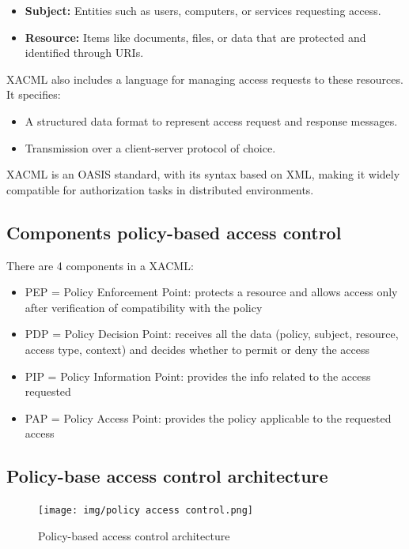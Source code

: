 \begin{itemize}
    \item \textbf{Subject:} Entities such as users, computers, or
      services requesting access.
    \item \textbf{Resource:} Items like documents, files, or data that
      are protected and identified through URIs.
\end{itemize}

XACML also includes a language for managing access requests to these
resources. It specifies:

\begin{itemize}
    \item A structured data format to represent access request and
      response messages.
    \item Transmission over a client-server protocol of choice.
\end{itemize}

XACML is an OASIS standard, with its syntax based on XML, making it
widely compatible for authorization tasks in distributed environments.

\subsection{Components policy-based access control}
There are 4 components in a XACML:
\begin{itemize}
  \item  PEP = Policy Enforcement Point: protects a resource and
    allows access only after verification of compatibility with the
    policy
  \item  PDP = Policy Decision Point: receives all the data (policy,
    subject, resource, access type, context) and decides whether to
    permit or deny the access
  \item PIP = Policy Information Point: provides the info related to
    the access requested
  \item PAP = Policy Access Point: provides the policy applicable to
    the requested access
\end{itemize}

\subsection{Policy-base access control architecture}

\begin{figure}[H]
  \centering
  \texttt{[image: img/policy access
  control.png]}
  \caption{Policy-based access control architecture}
\end{figure}

